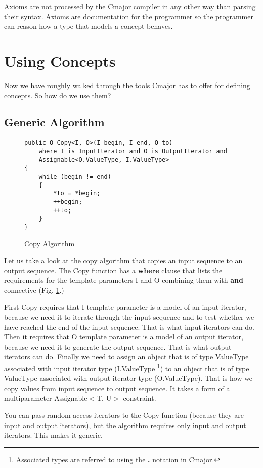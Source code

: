 \documentclass[oneside, a4paper, 11pt]{article}
\begin{document}
Axioms are not processed by the Cmajor compiler in any other way than
parsing their syntax.
Axioms are documentation for the programmer so the programmer can reason
how a type that models a concept behaves.

\section{Using Concepts}

Now we have roughly walked through the tools Cmajor has to offer for defining concepts.
So how do we use them?

\subsection{Generic Algorithm}

\begin{figure}[htb]\caption{Copy Algorithm}\label{fig:copy}
\begin{lstlisting}[frame=trBL]
public O Copy<I, O>(I begin, I end, O to)
    where I is InputIterator and O is OutputIterator and
    Assignable<O.ValueType, I.ValueType>
{
    while (begin != end)
    {
        *to = *begin;
        ++begin;
        ++to;
    }
}
\end{lstlisting}
\end{figure}

Let us take a look at the copy algorithm that copies an input sequence to an output sequence.
The Copy function has a \textbf{where} clause that lists the requirements for the template parameters I and O
combining them with \textbf{and} connective (Fig. \ref{fig:copy}.)

First Copy requires that I template parameter is a model of an input iterator,
because we need it to iterate through the input sequence and
to test whether we have reached the end of the input sequence. That is what input iterators can do.
Then it requires that O template parameter is a model of an output iterator, because we need it to
generate the output sequence. That is what output iterators can do.
Finally we need to assign an object that is of type ValueType associated with input iterator type (I.ValueType
\footnote{Associated types are referred to using the \textbf{.} notation in Cmajor.}) to an
object that is of type ValueType associated with output iterator type (O.ValueType).
That is how we copy values from input sequence to output sequence.
It takes a form of a multiparameter Assignable$<$T, U$>$ constraint.

You can pass random access iterators to the Copy function (because they are input and output iterators),
but the algorithm requires only input and output iterators. This makes it generic.
\end{document}
